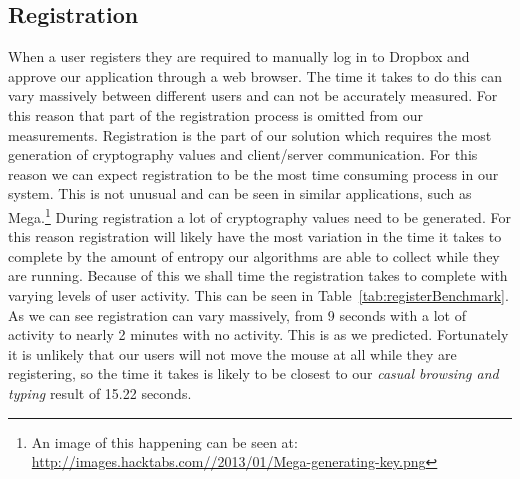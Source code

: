 \documentclass[12pt, titlepage]{article}
\begin{document}
\subsection{Registration}
When a user registers they are required to manually log in to Dropbox and approve our application through a web browser. The time it takes to do this can vary massively between different users and can not be accurately measured. For this reason that part of the registration process is omitted from our measurements. 
\newline \indent Registration is the part of our solution which requires the most generation of cryptography values and client/server communication. For this reason we can expect registration to be the most time consuming process in our system. This is not unusual and can be seen in similar applications, such as Mega.\footnote{An image of this happening can be seen at: \url{http://images.hacktabs.com//2013/01/Mega-generating-key.png}}
\newline \indent During registration a lot of cryptography values need to be generated. For this reason registration will likely have the most variation in the time it takes to complete by the amount of entropy our algorithms are able to collect while they are running. Because of this we shall time the registration takes to complete with varying levels of user activity. This can be seen in Table~\ref{tab:registerBenchmark}. As we can see registration can vary massively, from 9 seconds with a lot of activity to nearly 2 minutes with no activity. This is as we predicted. Fortunately it is unlikely that our users will not move the mouse at all while they are registering, so the time it takes is likely to be closest to our \textit{casual browsing and typing} result of 15.22 seconds.
\end{document}
